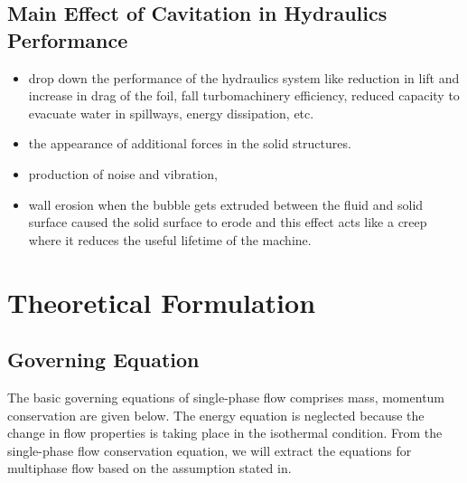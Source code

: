 \section{Main Effect of Cavitation in Hydraulics Performance}
\begin{itemize}
\item drop down the performance of the hydraulics system like reduction in lift and increase in drag of the foil, fall turbomachinery efficiency, reduced capacity to evacuate water in spillways, energy 
dissipation, etc.
\item the appearance of additional forces in the solid structures.
\item production of noise and vibration,
\item wall erosion when the bubble gets extruded between the fluid and solid surface caused the solid surface to erode and this effect  acts like a creep where it reduces the useful lifetime of the machine.
\end{itemize}

\chapter{Theoretical Formulation}
\label{chap:chapter2}
\section{Governing Equation}
The basic governing equations of single-phase flow comprises mass, momentum conservation are given below. The energy equation is neglected because the change in flow properties is taking place in the isothermal condition.
From the single-phase flow conservation equation, we will extract the equations for multiphase flow based on the assumption stated in\cite{CavitationandBubbleDynamics.1995,Hidalgo2014}.\\
